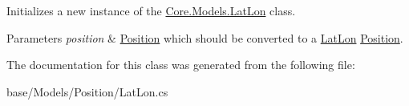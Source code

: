 Initializes a new instance of the \hyperlink{classCore_1_1Models_1_1LatLon}{Core.\-Models.\-Lat\-Lon} class. 


\begin{DoxyParams}{Parameters}
{\em position} & \hyperlink{classCore_1_1Models_1_1Position}{Position} which should be converted to a \hyperlink{classCore_1_1Models_1_1LatLon}{Lat\-Lon} \hyperlink{classCore_1_1Models_1_1Position}{Position}.\\
\hline
\end{DoxyParams}


The documentation for this class was generated from the following file\-:\begin{DoxyCompactItemize}
\item 
base/\-Models/\-Position/Lat\-Lon.\-cs\end{DoxyCompactItemize}

